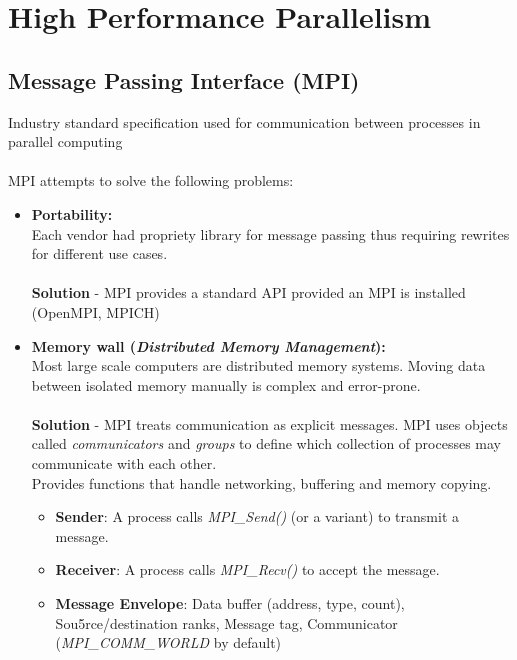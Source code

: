 \documentclass[11pt,a4paper]{article}
\begin{document}
	
	\section{High Performance Parallelism}
	\label{sec:background}
	\subsection{Message Passing Interface (MPI)}
	Industry standard specification used for communication between processes in parallel computing
	\\\\MPI attempts to solve the following problems:
	
	\begin{itemize} 
		\item \textbf{Portability:}
		\\Each vendor had propriety library for message passing thus requiring rewrites for different use cases.\\
		\\\textbf{Solution} - MPI provides a standard API provided an MPI is installed (OpenMPI, MPICH)
		
		\item \textbf{Memory wall (\textit{Distributed Memory Management}):}
		\\Most large scale computers are distributed memory systems. Moving data between isolated memory manually is complex and error-prone.\\
		\\\textbf{Solution} - MPI treats communication as explicit messages. MPI uses objects called \textit{communicators} 
		and \textit{groups} to define which collection of processes may 
		communicate with each other.\\
		Provides functions that handle networking, buffering and memory copying.
		\begin{itemize}
			\item\textbf{Sender}: A process calls \textit{MPI\_Send()} (or a variant) to transmit a message.
			\item\textbf{Receiver}: A process calls \textit{MPI\_Recv()} to accept the message.
			\item\textbf{Message Envelope}: Data buffer (address, type, count), Sou5rce/destination ranks, Message tag, Communicator (\textit{MPI\_COMM\_WORLD} by default)
		\end{itemize}
		

\end{itemize}
\end{document}
